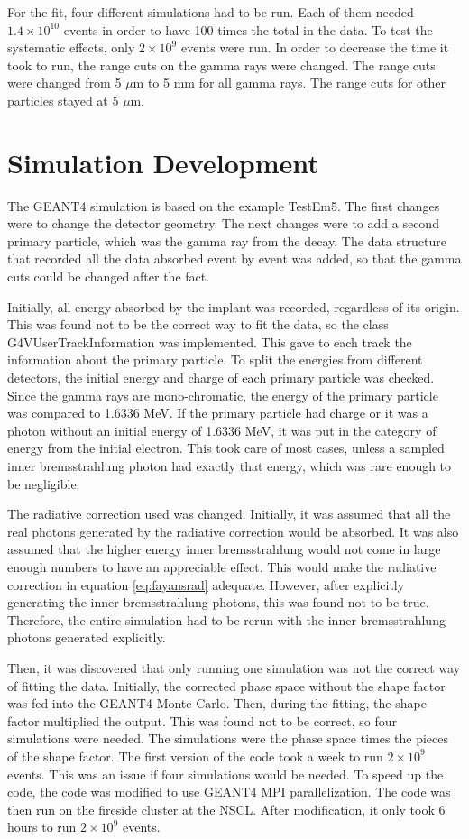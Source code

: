 \documentclass[../MaxHughesThesis.tex]{subfiles}
\begin{document}
For the fit, four different simulations had to be run.
Each of them needed $1.4 \times 10^{10}$ events in order to have 100 times the total in the data.
To test the systematic effects, only $2 \times 10^{9}$ events were run.
In order to decrease the time it took to run, the range cuts on the gamma rays were changed.
The range cuts were changed from 5 $\mu$m to 5 mm for all gamma rays.
The range cuts for other particles stayed at 5 $\mu$m.

\section{Simulation Development}
The GEANT4 simulation is based on the example TestEm5.
The first changes were to change the detector geometry. 
The next changes were to add a second primary particle, which was the gamma ray from the decay.
The data structure that recorded all the data absorbed event by event was added, so that the gamma cuts could be changed after the fact.

Initially, all energy absorbed by the implant was recorded, regardless of its origin.
This was found not to be the correct way to fit the data, so the class G4VUserTrackInformation was implemented.
This gave to each track the information about the primary particle.
To split the energies from different detectors, the initial energy and charge of each primary particle was checked.
Since the gamma rays are mono-chromatic, the energy of the primary particle was compared to 1.6336 MeV.
If the primary particle had charge or it was a photon without an initial energy of 1.6336 MeV, it was put in the category of energy from the initial electron. 
This took care of most cases, unless a sampled inner bremsstrahlung photon had exactly that energy, which was rare enough to be negligible.

The radiative correction used was changed.
Initially, it was assumed that all the real photons generated by the radiative correction would be absorbed.
It was also assumed that the higher energy inner bremsstrahlung would not come in large enough numbers to have an appreciable effect. 
This would make the radiative correction in equation \ref{eq:fayansrad} adequate. 
However, after explicitly generating the inner bremsstrahlung photons, this was found not to be true.
Therefore, the entire simulation had to be rerun with the inner bremsstrahlung photons generated explicitly.

Then, it was discovered that only running one simulation was not the correct way of fitting the data.
Initially, the corrected phase space without the shape factor was fed into the GEANT4 Monte Carlo.
Then, during the fitting, the shape factor multiplied the output. 
This was found not to be correct, so four simulations were needed.
The simulations were the phase space times the pieces of the shape factor.
The first version of the code took a week to run $2 \times 10^{9}$ events.
This was an issue if four simulations would be needed.
To speed up the code, the code was modified to use GEANT4 MPI parallelization.
The code was then run on the fireside cluster at the NSCL.
After modification, it only took 6 hours to run $2 \times 10^{9}$ events.
\end{document}
